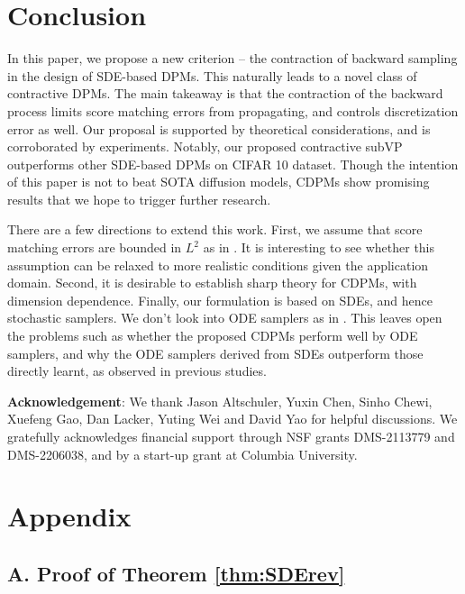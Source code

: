 \documentclass[letterpaper,11pt,reqno]{amsart}
\numberwithin{equation}{section}
\begin{document}
\section{Conclusion}
\label{sc5}

\quad In this paper,
we propose a new criterion -- 
the contraction of backward sampling
in the design of SDE-based DPMs.
This naturally leads to a novel class of contractive DPMs.
The main takeaway is that the contraction of the backward process
limits score matching errors from propagating,
and controls discretization error as well. 
Our proposal is supported by theoretical considerations,
and is corroborated by experiments. 
Notably, our proposed contractive subVP outperforms
other SDE-based DPMs on CIFAR 10 dataset.
Though the intention of this paper is not to beat SOTA diffusion models,
CDPMs show promising results
that we hope to trigger further research.

\quad There are a few directions to extend this work.
First, we assume that score matching errors
are bounded in $L^2$
as in \cite{Chen23, GNZ23, LLT23}.
It is interesting to see whether this assumption 
can be relaxed to more realistic conditions 
given the application domain. 
Second, it is desirable to establish sharp theory for CDPMs, with dimension dependence.
Finally, our formulation is based on SDEs,
and hence stochastic samplers.
We don't look into ODE samplers as in 
\cite{Song20,xu2022poisson,LW23, Chen23b}.
This leaves open the problems such as
whether the proposed CDPMs perform
well by ODE samplers,
and why the ODE samplers derived from SDEs
outperform those directly learnt,
as observed in previous studies.


\medskip
{\bf Acknowledgement}: 
We thank Jason Altschuler, Yuxin Chen, Sinho Chewi, Xuefeng Gao, Dan Lacker, Yuting Wei and David Yao for helpful discussions.
We gratefully acknowledges financial support through NSF grants DMS-2113779 and
DMS-2206038,
and by a start-up grant at Columbia University.

\newpage
\section*{Appendix}

\subsection*{A. Proof of Theorem \ref{thm:SDErev}}
\end{document}
